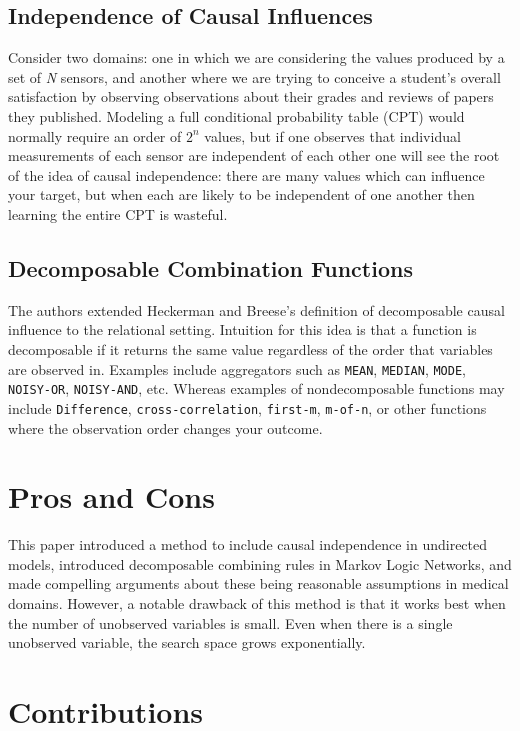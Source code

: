 \documentclass[letterpaper]{article}
\begin{document}
\subsection{Independence of Causal Influences}

Consider two domains: one in which we are considering the values produced by a set of \textit{N} sensors, and another where we are trying to conceive a student's overall satisfaction by observing observations about their grades and reviews of papers they published. Modeling a full conditional probability table (CPT) would normally require an order of $2^n$ values, but if one observes that individual measurements of each sensor are independent of each other one will see the root of the idea of causal independence: there are many values which can influence your target, but when each are likely to be independent of one another then learning the entire CPT is wasteful.

\subsection{Decomposable Combination Functions}

The authors extended Heckerman and Breese's definition of decomposable causal influence to the relational setting. Intuition for this idea is that a function is decomposable if it returns the same value regardless of the order that variables are observed in. Examples include aggregators such as \texttt{MEAN}, \texttt{MEDIAN}, \texttt{MODE}, \texttt{NOISY-OR}, \texttt{NOISY-AND}, etc. Whereas examples of nondecomposable functions may include \texttt{Difference}, \texttt{cross-correlation}, \texttt{first-m}, \texttt{m-of-n}, or other functions where the observation order changes your outcome.

\section{Pros and Cons}
This paper introduced a method to include causal independence in undirected models, introduced decomposable combining rules in Markov Logic Networks, and made compelling arguments about these being reasonable assumptions in medical domains. However, a notable drawback of this method is that it works best when the number of unobserved variables is small. Even when there is a single unobserved variable, the search space grows exponentially.

\section{Contributions}
\end{document}
